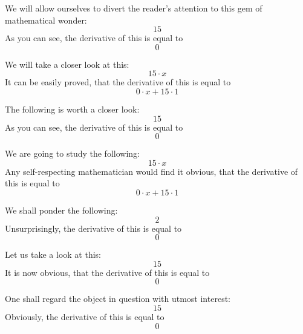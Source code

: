 \documentclass{article}
\begin{document}
We will allow ourselves to divert the reader's attention to this gem of mathematical wonder:
\begin{equation}
15 
\end{equation}
As you can see, the derivative of this is equal to
\begin{equation}
0 
\end{equation}

We will take a closer look at this:
\begin{equation}
15 \cdot x 
\end{equation}
It can be easily proved, that the derivative of this is equal to
\begin{equation}
0 \cdot x + 15 \cdot 1 
\end{equation}

The following is worth a closer look:
\begin{equation}
15 
\end{equation}
As you can see, the derivative of this is equal to
\begin{equation}
0 
\end{equation}

We are going to study the following:
\begin{equation}
15 \cdot x 
\end{equation}
Any self-respecting mathematician would find it obvious, that the derivative of this is equal to
\begin{equation}
0 \cdot x + 15 \cdot 1 
\end{equation}

We shall ponder the following:
\begin{equation}
2 
\end{equation}
Unsurprisingly, the derivative of this is equal to
\begin{equation}
0 
\end{equation}

Let us take a look at this:
\begin{equation}
15 
\end{equation}
It is now obvious, that the derivative of this is equal to
\begin{equation}
0 
\end{equation}

One shall regard the object in question with utmost interest:
\begin{equation}
15 
\end{equation}
Obviously, the derivative of this is equal to
\begin{equation}
0 
\end{equation}
\end{document}
